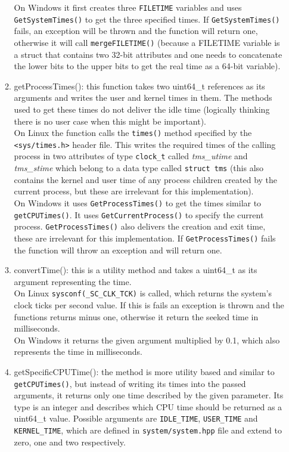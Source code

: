 \begin{enumerate}
\begin{enumerate}
		On Windows it first creates three \texttt{FILETIME} variables and uses \texttt{GetSystemTimes()} to get the three specified times. If \texttt{GetSystemTimes()} fails, an exception will be thrown and the function will return one, otherwise it will call \texttt{mergeFILETIME()} (because a FILETIME variable is a struct that contains two 32-bit attributes and one needs to concatenate the lower bits to the upper bits to get the real time as a 64-bit variable).
		\item getProcessTimes(): this function takes two uint64\_t references as its arguments and writes the user and kernel times in them. The methods used to get these times do not deliver the idle time (logically thinking there is no user case when this might be important).\\
		On Linux the function calls the \texttt{times()} method specified by the \texttt{<sys/times.h>} header file. This writes the required times of the calling process in two attributes of type \texttt{clock\_t} called \textit{tms\_utime} and \textit{tms\_stime} which belong to a  data type called \texttt{struct tms} (this also contains the kernel and user time of any process children created by the current process, but these are irrelevant for this implementation).\\
		On Windows it uses \texttt{GetProcessTimes()} to get the times similar to \texttt{getCPUTimes()}. It uses \texttt{GetCurrentProcess()} to specify the current process. \texttt{GetProcessTimes()} also delivers the creation and exit time, these are irrelevant for this implementation. If \texttt{GetProcessTimes()} fails the function will throw an exception and will return one.
		\item convertTime(): this is a utility method and takes a uint64\_t as its argument representing the time. \\
		On Linux \texttt{sysconf(\_SC\_CLK\_TCK)} is called, which returns the system's clock ticks per second value. If this is fails an exception is thrown and the functions returns minus one, otherwise it return the seeked time in milliseconds.\\
		On Windows it returns the given argument multiplied by 0.1, which also represents the time in milliseconds.
		\item getSpecificCPUTime(): the method is more utility based and similar to \texttt{getCPUTimes()}, but instead of writing its times into the passed arguments, it returns only one time described by the given parameter. Its type is an integer and describes which CPU time should be returned as a uint64\_t value. Possible arguments are \texttt{IDLE\_TIME}, \texttt{USER\_TIME} and \texttt{KERNEL\_TIME}, which are defined in \texttt{system/system.hpp} file and extend to zero, one and two respectively.

\end{enumerate}
\end{enumerate}
